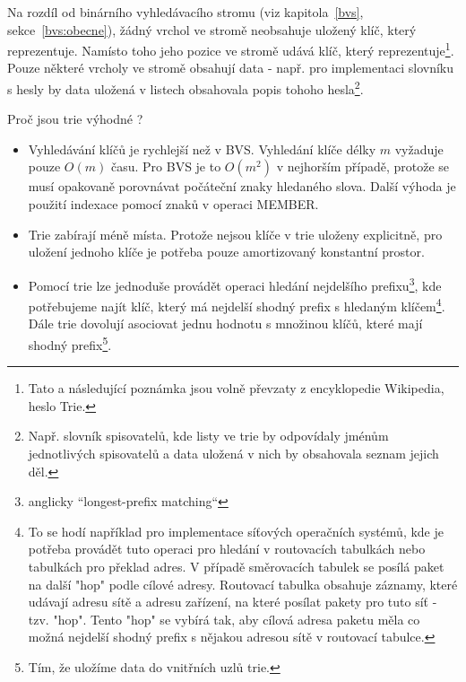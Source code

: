 \begin{pozn}
Na rozdíl od binárního vyhledávacího stromu (viz kapitola~\ref{bvs},
sekce~\ref{bvs:obecne}), žádný vrchol ve stromě neobsahuje uložený klíč,
který reprezentuje. Namísto toho jeho pozice ve stromě udává klíč, který
reprezentuje\footnote{Tato a následující poznámka jsou volně převzaty z
encyklopedie Wikipedia, heslo Trie.}. 
Pouze některé vrcholy ve stromě obsahují data - např. pro
implementaci slovníku s hesly by data uložená v listech obsahovala popis
tohoho hesla\footnote{Např. slovník spisovatelů, kde listy ve trie by
odpovídaly jménům jednotlivých spisovatelů a data uložená v nich by 
obsahovala seznam jejich děl.}.
\end{pozn}

\begin{pozn}
Proč jsou trie výhodné ?

\begin{itemize}
  \item Vyhledávání klíčů je rychlejší než v BVS. Vyhledání klíče délky
  $m$ vyžaduje pouze $O(m)$ času. Pro BVS je to $O(m^2)$ v nejhorším případě,
  protože se musí opakovaně porovnávat počáteční znaky hledaného slova.
  Další výhoda je použití indexace pomocí znaků v operaci MEMBER.
  \item Trie zabírají méně místa. Protože nejsou klíče v trie uloženy
  explicitně, pro uložení jednoho klíče je potřeba pouze amortizovaný
  konstantní prostor.
  \item Pomocí trie lze jednoduše provádět operaci hledání nejdelšího 
  prefixu\footnote{anglicky ``longest-prefix matching``}, kde potřebujeme
  najít klíč, který má nejdelší shodný prefix s hledaným
  klíčem\footnote{To se hodí například pro implementace síťových
  operačních systémů, kde je potřeba provádět tuto operaci pro
  hledání v routovacích tabulkách nebo tabulkách pro překlad adres. 
  V případě směrovacích tabulek se posílá paket na další "hop" podle 
  cílové adresy. Routovací tabulka obsahuje záznamy, které udávají adresu
  sítě a adresu zařízení, na které posílat pakety pro tuto síť - tzv.
  "hop". Tento "hop" se vybírá tak, aby cílová adresa paketu měla
  co možná nejdelší shodný prefix s nějakou adresou sítě v routovací
  tabulce.}. 
  Dále trie dovolují asociovat jednu hodnotu s množinou klíčů, které mají
  shodný prefix\footnote{Tím, že uložíme data do vnitřních uzlů trie.}.
\end{itemize}
\end{pozn}

